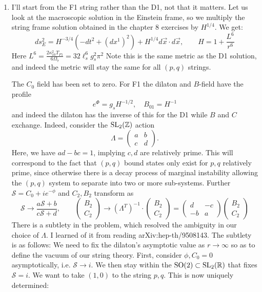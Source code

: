 \documentclass[11pt, class=article, crop=false]{standalone}
\begin{document}
\begin{enumerate}
	\item I'll start from the F1 string rather than the D1, not that it matters. Let us look at the macroscopic solution in the Einstein frame, so we multiply the string frame solution obtained in the chapter 8 exercises by $H^{1/4}$. We get:
	\[
		ds^2_E = H^{-3/4}(-dt^2 + (dx^1)^2)+ H^{1/4} d \vec x \cdot d \vec x, \qquad H = 1 + \frac{L^6}{r^6}
	\]
	Here $L^6 = \frac{2 \kappa_{10}^2 T_{F1}}{6 \Omega_7} = 32 \ell_s^6 g_s^2 \pi^2$ %
	Note this is the same metric as the D1 solution, and indeed the metric will stay the same for all $(p,q)$ strings.
	
	The $C_0$ field has been set to zero. For F1 the dilaton and $B$-field have the profile
	\[
		e^{\Phi} = g_s H^{-1/2}, \quad B_{01} = H^{-1}
	\]
	and indeed the dilaton has the inverse of this for the D1 while $B$ and $C$ exchange. Indeed, consider the $\mathrm{SL}_2(\mathbb{Z})$ action 
	\[
		\Lambda = \begin{pmatrix}
			a & b \\  c & d
		\end{pmatrix}.
	\]
	Here, we have $ad-bc = 1$, implying $c, d$ are relatively prime. This will correspond to the fact that $(p,q)$ bound states only exist for $p,q$ relatively prime, since otherwise there is a decay process of marginal instability allowing the $(p,q)$ system to separate into two or more sub-systems. Further $\mathcal S = C_0 + i e^{-\phi}$ and $C_2, B_2$ transform as
	\[
		\mathcal S \to \frac{a \mathcal S + b}{c \mathcal S + d}, \qquad \begin{pmatrix}
			B_2\\C_2
		\end{pmatrix} \to (\Lambda^T)^{-1} \cdot \begin{pmatrix}
			B_2 \\ C_2
		\end{pmatrix} = \begin{pmatrix}
			d & -c\\ -b & a
		\end{pmatrix}   \begin{pmatrix}
			B_2 \\ C_2
		\end{pmatrix}
	\]
	There is a subtlety in the problem, which resolved the ambiguity in our choice of $\Lambda$. I learned of it from reading arXiv:hep-th/9508143. The subtlety is as follows: We need to fix the dilaton's asymptotic value as $r \to \infty$ so as to define the vacuum of our string theory. First, consider $\phi, C_0 = 0$ asymptotically, i.e. $\mathcal S \to i$. We then stay within the $\mathrm{SO}(2) \subset  \mathrm{SL}_2(\mathbb{R})$ that fixes $\mathcal S = i$. We want to take $(1,0)$ to the string $p, q$. This is now uniquely determined:

\end{enumerate}
\end{document}
